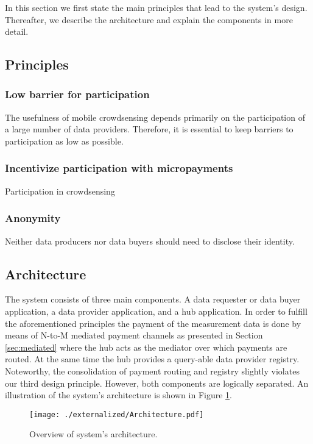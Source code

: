 In this section we first state the main principles that lead to the system's design. Thereafter, we describe the architecture and explain the components in more detail.

\subsection{Principles}
\label{sec:principles}

\subsubsection{Low barrier for participation}
The usefulness of mobile crowdsensing depends primarily on the participation of a large number of data providers. Therefore, it is essential to keep barriers to participation as low as possible.

\subsubsection{Incentivize participation with micropayments}
Participation in crowdsensing 

\subsubsection{Anonymity}
Neither data producers nor data buyers should need to disclose their identity. 

\subsection{Architecture}
The system consists of three main components. A data requester or data buyer application, a data provider application, and a hub application. In order to fulfill the aforementioned principles the payment of the measurement data is done by means of N-to-M mediated payment channels as presented in Section \ref{sec:mediated} where the hub acts as the mediator over which payments are routed. At the same time the hub provides a query-able data provider registry. Noteworthy, the consolidation of payment routing and registry slightly violates our third design principle. However, both components are logically separated. An illustration of the system's architecture is shown in Figure \ref{fig:architecture}.


 \begin{figure}
 \texttt{[image: ./externalized/Architecture.pdf]}
 \caption{Overview of system's architecture.}
 \label{fig:architecture}
 \end{figure}

